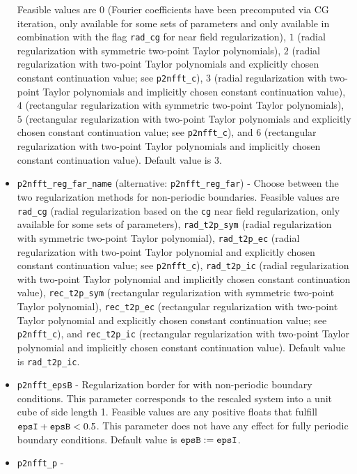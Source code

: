 \begin{itemize}
    Feasible values are 
    $0$ (Fourier coefficients have been precomputed via CG iteration, only available for some sets of parameters and only available in combination with the flag \verb!rad_cg! for near field regularization),
    $1$ (radial regularization with symmetric two-point Taylor polynomials),
    $2$ (radial regularization with two-point Taylor polynomials and explicitly chosen constant continuation value; see \verb!p2nfft_c!),
    $3$ (radial regularization with two-point Taylor polynomials and implicitly chosen constant continuation value),
    $4$ (rectangular regularization with symmetric two-point Taylor polynomials),
    $5$ (rectangular regularization with two-point Taylor polynomials and explicitly chosen constant continuation value; see \verb!p2nfft_c!), and
    $6$ (rectangular regularization with two-point Taylor polynomials and implicitly chosen constant continuation value). 
    Default value is $3$.
  \item \verb!p2nfft_reg_far_name! (alternative: \verb!p2nfft_reg_far!) -
    Choose between the two regularization methods for non-periodic boundaries. Feasible values are
    \verb!rad_cg!      (radial regularization based on the \verb!cg! near field regularization, only available for some sets of parameters),
    \verb!rad_t2p_sym! (radial regularization with symmetric two-point Taylor polynomial),
    \verb!rad_t2p_ec!  (radial regularization with two-point Taylor polynomial and explicitly chosen constant continuation value; see \verb!p2nfft_c!),
    \verb!rad_t2p_ic!  (radial regularization with two-point Taylor polynomial and implicitly chosen constant continuation value),
    \verb!rec_t2p_sym! (rectangular regularization with symmetric two-point Taylor polynomial),
    \verb!rec_t2p_ec!  (rectangular regularization with two-point Taylor polynomial and explicitly chosen constant continuation value; see \verb!p2nfft_c!), and
    \verb!rec_t2p_ic!  (rectangular regularization with two-point Taylor polynomial and implicitly chosen constant continuation value).
    Default value is \verb!rad_t2p_ic!.
  \item \verb!p2nfft_epsB! -
    Regularization border for \ptwonfft with non-periodic boundary conditions. This parameter corresponds to the rescaled system into a unit cube of side length 1.
    Feasible values are any positive floats that fulfill $\verb!epsI! + \verb!epsB! < 0.5$.
    This parameter does not have any effect for fully periodic boundary conditions. Default value is $\verb!epsB! := \verb!epsI!$.
  \item \verb!p2nfft_p! -

\end{itemize}
